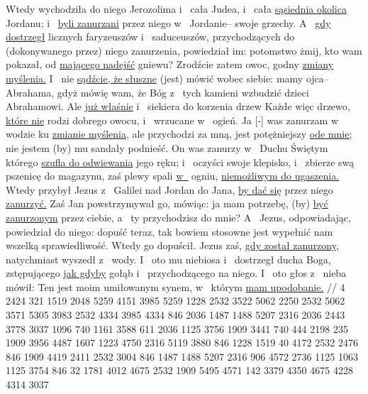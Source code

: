  Wtedy wychodziła do niego Jerozolima i~ cała Judea, i~ cała \underline{sąsiednia okolica} Jordanu;
 i~ \underline{byli zanurzani} przez niego w~ Jordanie–  swoje grzechy.
 A~ \underline{gdy dostrzegł} licznych faryzeuszów i~ saduceuszów, przychodzących do (dokonywanego przez) niego zanurzenia, powiedział im: potomstwo żmij, kto wam pokazał,  od \underline{mającego nadejść} gniewu?
 Zrodźcie zatem owoc, godny \underline{zmiany myślenia.}
 I~ nie \underline{sądźcie, że słuszne} (jest) mówić wobec siebie: mamy ojca– Abrahama, gdyż mówię wam, że Bóg  z~ tych kamieni wzbudzić dzieci Abrahamowi.
 Ale \underline{już właśnie} i~ siekiera do korzenia drzew  Każde więc drzewo, \underline{które nie} rodzi dobrego owocu,  i~ wrzucane w~ ogień.
 Ja [-] was zanurzam w~ wodzie ku \underline{zmianie myślenia,} ale  przychodzi za mną, jest potężniejszy \underline{ode mnie;} nie jestem  (by) mu sandały podnieść. On was zanurzy w~ Duchu Świętym
 którego \underline{szufla do odwiewania}  jego ręku; i~ oczyści swoje klepisko, i~ zbierze swą pszenicę do magazynu, zaś plewy spali \underline{w~} ogniu, \underline{niemożliwym do ugaszenia.}
 Wtedy przybył Jezus z~ Galilei nad Jordan do Jana, \underline{by dać się} przez niego \underline{zanurzyć.}
 Zaś Jan powstrzymywał go, mówiąc: ja mam potrzebę, (by) \underline{być zanurzonym} przez ciebie, a~ ty przychodzisz do mnie?
 A~ Jezus, odpowiadając, powiedział do niego: dopuść teraz, tak bowiem stosowne jest wypełnić nam wszelką sprawiedliwość. Wtedy go dopuścił.
 Jezus zaś, \underline{gdy został zanurzony,} natychmiast wyszedł z~ wody. I~ oto  mu niebiosa i~ dostrzegł ducha Boga, zstępującego \underline{jak gdyby} gołąb i~ przychodzącego na niego.
 I~ oto głos z~ nieba mówił: Ten jest moim umiłowanym synem, w~ którym \underline{mam upodobanie.}
//
\endgl
\begingl
\lettrine[loversize=1,lraise=-1.3]{4 }{}%
 2424 321 1519 2048 5259 4151 {} 3985 5259 1228
{} 2532 3522 5062 2250 2532 5062 3571 5305 3983
{} 2532 4334 3985 4334 846 2036 1487 1488 5207 2316 2036 2443 3778 3037 1096 740
{} 1161 3588 611 2036 1125 3756 1909 3441 740 444 2198 235 1909 3956 4487 1607 1223 4750 2316
{} 5119 3880 846 1228 1519 40 4172 2532 2476 846 1909 4419 2411
{} 2532 3004 846 1487 1488 5207 2316 906 4572 2736 1125 1063 1125 3754 846 32 1781 4012 4675 2532 1909 5495 4571 142 3379 4350 4675 4228 4314 3037
